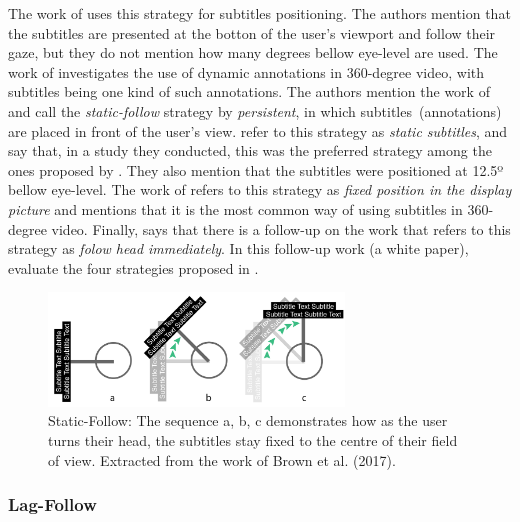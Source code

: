 The work of \cite{meira_video_2016} uses this strategy for subtitles positioning. The authors mention that the subtitles are presented at the botton of the user's viewport and follow their gaze, but they do not mention how many degrees bellow eye-level are used. The work of \cite{matos_dynamic_2018} investigates the use of dynamic annotations in 360-degree video, with subtitles being one kind of such annotations. The authors mention the work of \cite{brown_subtitles_2017} and call the \emph{static-follow} strategy by \emph{persistent}, in which subtitles~(annotations) are placed in front of the user's view. \cite{rothe_dynamic_2018} refer to this strategy as \emph{static subtitles}, and say that, in a study they conducted, this was the preferred strategy among the ones proposed by \cite{brown_subtitles_2017}. They also mention that the subtitles were positioned at 12.5º bellow eye-level. The work of \cite{hughes_disruptive_2019} refers to this strategy as \emph{fixed position in the display picture} and mentions that it is the most common way of using subtitles in 360-degree video. Finally, \cite{montagud_culture_2020} says that there is a follow-up on the work \cite{brown_subtitles_2017} that refers to this strategy as \emph{folow head immediately}. In this follow-up work (a white paper), \cite{brown2018exploring} evaluate the four strategies proposed in \cite{brown_subtitles_2017}. 

\begin{figure}[!ht]
    \centering
    \includegraphics[width=0.7\textwidth]{img/video360/static-follow.png}
    \caption{Static-Follow: The sequence a, b, c demonstrates how as the user turns their head, the subtitles stay fixed to the centre of their field of view. Extracted from the work of Brown et al. (2017).}
    \label{fig:static_follow}
\end{figure}

\subsubsection{Lag-Follow}
\label{subsubsec:lag_follow}

